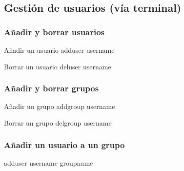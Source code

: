 \documentclass[colorlinks,10pt]{beamer}
\begin{document}
\subsection{Gestión de usuarios (vía terminal)}

\begin{frame}
  \frametitle{Añadir y borrar usuarios}
  \begin{block}{Añadir un usuario}
    adduser username
  \end{block}
 \pause \begin{block}{Borrar un usuario}
    deluser username
  \end{block}
\end{frame}



\begin{frame}
  \frametitle{Añadir y borrar grupos}
  \begin{block}{Añadir un grupo}
    addgroup username
  \end{block}
 \pause \begin{block}{Borrar un grupo}
    delgroup username
  \end{block}
\end{frame}



\begin{frame}
  \frametitle{Añadir un usuario a un grupo}
  \begin{block}{}
    adduser username groupname
  \end{block}
\end{frame}
\end{document}
